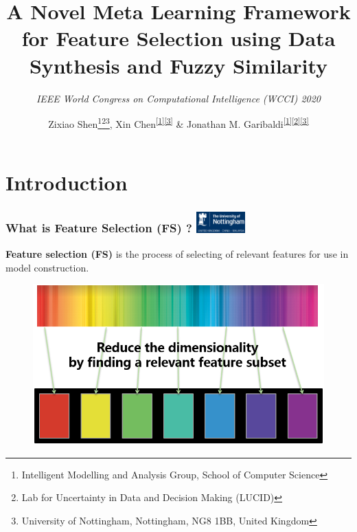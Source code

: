 \documentclass[aspectratio=1610]{beamer}
\title{A Novel Meta Learning Framework for Feature Selection using Data Synthesis and Fuzzy Similarity\\}
\subtitle{\textit{IEEE World Congress on Computational Intelligence (WCCI) 2020}}
\author{Zixiao Shen\footnote
            {\label{1} Intelligent Modelling and Analysis Group, School of Computer Science}\footnote
            {\label{2} Lab for Uncertainty in Data and Decision Making (LUCID)}\footnote
            {\label{3} University of Nottingham, Nottingham, NG8 1BB, United Kingdom},
        Xin Chen\textsuperscript{\ref{1}\ref{3}} \&
        Jonathan M. Garibaldi\textsuperscript{\ref{1}\ref{2}\ref{3}}}
\institute{Presented by:\\ 
            Zixiao Shen\\
            22$^\text{nd}$ July 2020}
\date{\textit{\tiny{\url{}}}}
\newcommand{\UoN}
  {\hfill {\includegraphics[height=0.8cm]{nott_logo/nott_logo_white.png}}}
\begin{document}
\begin{frame}
  \titlepage
\end{frame}

\section{Introduction}

\begin{frame}
\frametitle{What is Feature Selection (FS) ? \UoN}

\textbf{Feature selection (FS)} is the process of selecting of relevant features for use in model construction. 

	\begin{figure}
		\includegraphics[scale=0.6]{Figures/Feature_Selection.png}
	\end{figure}

\end{frame}
\end{document}
